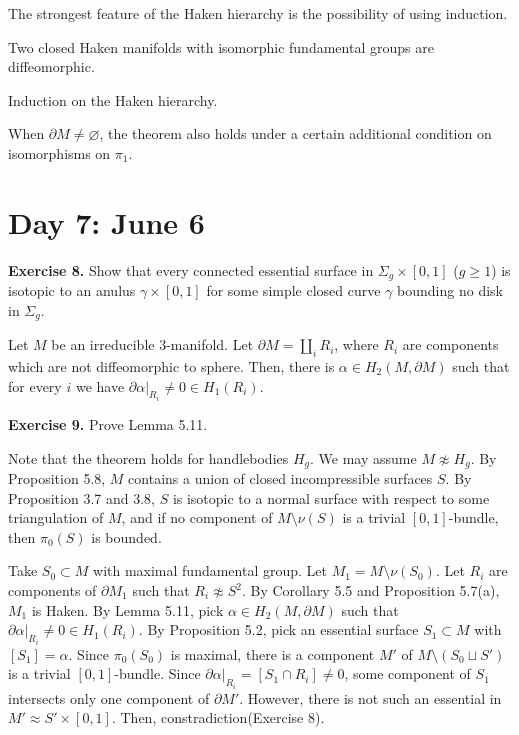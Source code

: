 \documentclass{../../../small}
\begin{document}
The strongest feature of the Haken hierarchy is the possibility of using induction.

\begin{thm}[Waldhausen]
Two closed Haken manifolds with isomorphic fundamental groups are diffeomorphic.
\end{thm}
\begin{pf}
Induction on the Haken hierarchy.
\end{pf}

\begin{rmk*}
When $\partial M\ne\varnothing$, the theorem also holds under a certain additional condition on isomorphisms on $\pi_1$.
\end{rmk*}


\newpage
\setcounter{section}{6}
\section{Day 7: June 6}
\setcounter{section}{5}

\noindent\textbf{Exercise 8.} Show that every connected essential surface in $\Sigma_g\times[0,1]$ ($g\ge1$) is isotopic to an anulus $\gamma\times[0,1]$ for some simple closed curve $\gamma$ bounding no disk in $\Sigma_g$.
\setcounter{thm}{10}
\begin{lem}
Let $M$ be an irreducible 3-manifold.
Let $\partial M=\coprod_iR_i$, where $R_i$ are components which are not diffeomorphic to sphere.
Then, there is $\alpha\in H_2(M,\partial M)$ such that for every $i$ we have $\partial\alpha|_{R_i}\ne0\in H_1(R_i)$.
\end{lem}

\noindent\textbf{Exercise 9.} Prove Lemma 5.11.

\begin{pf}
Note that the theorem holds for handlebodies $H_g$.
We may assume $M\not\approx H_g$.
By Proposition 5.8, $M$ contains a union of closed incompressible surfaces $S$.
By Proposition 3.7 and 3.8, $S$ is isotopic to a normal surface with respect to some triangulation of $M$, and if no component of $M\setminus\nu(S)$ is a trivial $[0,1]$-bundle, then $\pi_0(S)$ is bounded.

Take $S_0\subset M$ with maximal fundamental group.
Let $M_1=M\setminus\nu(S_0)$.
Let $R_i$ are components of $\partial M_1$ such that $R_i\not\approx S^2$.
By Corollary 5.5 and Proposition 5.7(a), $M_1$ is Haken.
By Lemma 5.11, pick $\alpha\in H_2(M,\partial M)$ such that $\partial\alpha|_{R_i}\ne0\in H_1(R_i)$.
By Proposition 5.2, pick an essential surface $S_1\subset M$ with $[S_1]=\alpha$.
Since $\pi_0(S_0)$ is maximal, there is a component $M'$ of $M\setminus(S_0\sqcup S')$ is a trivial $[0,1]$-bundle.
Since $\partial\alpha|_{R_i}=[S_1\cap R_i]\ne0$, some component of $S_1$ intersects only one component of $\partial M'$.
However, there is not such an essential in $M'\approx S'\times[0,1]$.
Then, constradiction(Exercise 8).
\end{pf}
\end{document}
